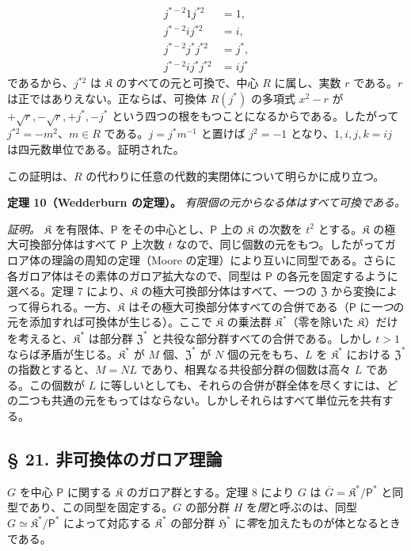 \[
\begin{aligned}
j^{*-2}1j^{*2}&=1,\\
j^{*-2}ij^{*2}&=i,\\
j^{*-2}j^*j^{*2}&=j^*,\\
j^{*-2}ij^*j^{*2}&=ij^*
\end{aligned}
\]
であるから、$j^{*2}$ は $\mathfrak K$ のすべての元と可換で、中心 $R$ に属し、実数 $r$ である。$r$ は正ではありえない。正ならば、可換体 $R(j^*)$ の多項式 $x^2-r$ が $+\sqrt r,-\sqrt r,+j^*,-j^*$ という四つの根をもつことになるからである。したがって $j^{*2}=-m^2$、$m\in R$ である。$j=j^*m^{-1}$ と置けば $j^2=-1$ となり、$1,i,j,k=ij$ は四元数単位である。証明された。

この証明は、$R$ の代わりに任意の代数的実閉体について明らかに成り立つ。

\textbf{定理 10（Wedderburn の定理）。} \emph{有限個の元からなる体はすべて可換である。}

\emph{証明。} $\mathfrak K$ を有限体、$\mathsf P$ をその中心とし、$\mathsf P$ 上の $\mathfrak K$ の次数を $t^2$ とする。$\mathfrak K$ の極大可換部分体はすべて $\mathsf P$ 上次数 $t$ なので、同じ個数の元をもつ。したがってガロア体の理論の周知の定理（Moore の定理）により互いに同型である。さらに各ガロア体はその素体のガロア拡大なので、同型は $\mathsf P$ の各元を固定するように選べる。定理 7 により、$\mathfrak K$ の極大可換部分体はすべて、一つの $\mathfrak Z$ から変換によって得られる。一方、$\mathfrak K$ はその極大可換部分体すべての合併である（$\mathsf P$ に\emph{一つ}の元を添加すれば可換体が生じる）。ここで $\mathfrak K$ の乗法群 $\mathfrak K^*$（零を除いた $\mathfrak K$）だけを考えると、$\mathfrak K^*$ は部分群 $\mathfrak Z^*$ と共役な部分群すべての合併である。しかし $t>1$ ならば矛盾が生じる。$\mathfrak K^*$ が $M$ 個、$\mathfrak Z^*$ が $N$ 個の元をもち、$L$ を $\mathfrak K^*$ における $\mathfrak Z^*$ の指数とすると、$M=NL$ であり、相異なる共役部分群の個数は高々 $L$ である。この個数が $L$ に等しいとしても、それらの合併が群全体を尽くすには、どの二つも共通の元をもってはならない。しかしそれらはすべて単位元を共有する。

\subsection*{§ 21. 非可換体のガロア理論}\label{die-galoissche-theorie-der-nichtkommutativen-koerper}

$G$ を中心 $\mathsf P$ に関する $\mathfrak K$ のガロア群とする。定理 8 により $G$ は $\overline G=\mathfrak K^*/\mathsf P^*$ と同型であり、この同型を固定する。$G$ の部分群 $H$ を\emph{閉}と呼ぶのは、同型 $G\simeq\mathfrak K^*/\mathsf P^*$ によって対応する $\mathfrak K^*$ の部分群 $\mathfrak H^*$ に\emph{零}を加えたものが体となるときである。

